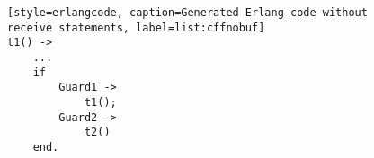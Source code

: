 \begin{figure}[h!]
\begin{verbatim}[style=erlangcode, caption=Generated Erlang code without receive statements, label=list:cffnobuf]
t1() -> 
    ...
    if
        Guard1 ->
            t1();
        Guard2 ->
            t2()
    end.
\end{verbatim}
\end{figure}
